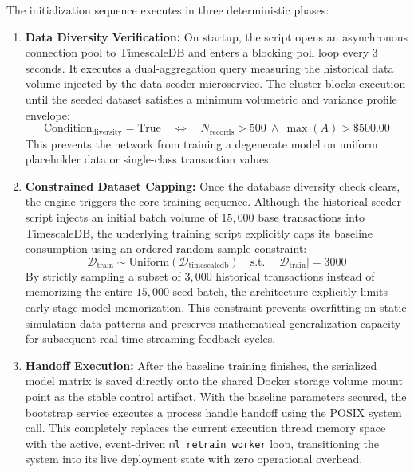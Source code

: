 \documentclass[12pt]{report}
\begin{document}
The initialization sequence executes in three deterministic phases:
\begin{enumerate}
    \item \textbf{Data Diversity Verification:} On startup, the script opens an asynchronous connection pool to TimescaleDB and enters a blocking poll loop every 3 seconds. It executes a dual-aggregation query measuring the historical data volume injected by the data seeder microservice. The cluster blocks execution until the seeded dataset satisfies a minimum volumetric and variance profile envelope:
    $$
        \text{Condition}_{\text{diversity}} = \text{True} \quad \iff \quad N_{\text{records}} > 500 \ \land \ \max(A) > \$500.00
    $$
    This prevents the network from training a degenerate model on uniform placeholder data or single-class transaction values.
    
    \item \textbf{Constrained Dataset Capping:} Once the database diversity check clears, the engine triggers the core training sequence. Although the historical seeder script injects an initial batch volume of $15,000$ base transactions into TimescaleDB, the underlying training script explicitly caps its baseline consumption using an ordered random sample constraint:
    $$
        \mathcal{D}_{\text{train}} \sim \text{Uniform}(\mathcal{D}_{\text{timescaledb}}) \quad \text{s.t.} \quad |\mathcal{D}_{\text{train}}| = 3000
    $$
    By strictly sampling a subset of $3,000$ historical transactions instead of memorizing the entire $15,000$ seed batch, the architecture explicitly limits early-stage model memorization. This constraint prevents overfitting on static simulation data patterns and preserves mathematical generalization capacity for subsequent real-time streaming feedback cycles.
    
    \item \textbf{Handoff Execution:} After the baseline training finishes, the serialized model matrix is saved directly onto the shared Docker storage volume mount point as the stable control artifact. With the baseline parameters secured, the bootstrap service executes a process handle handoff using the POSIX system call. This completely replaces the current execution thread memory space with the active, event-driven \texttt{ml\_retrain\_worker} loop, transitioning the system into its live deployment state with zero operational overhead.
\end{enumerate}
\end{document}
